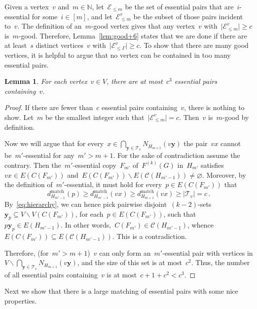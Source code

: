 \documentclass[oneside, 12pt]{amsart}
\numberwithin{equation}{section}
\numberwithin{figure}{section}
\let\emptyset=\varnothing
\let\setminus=\smallsetminus
\newcommand{\cC}{\mathcal{C}}
\newcommand{\cE}{\mathcal{E}}
\newcommand{\cT}{\mathcal{T}}
\theoremstyle{plain}
\newtheorem{lemma}[theorem]{Lemma}
\theoremstyle{note}
\theoremstyle{remark}
\begin{document}
	Given a vertex~$v$ and~$m\in\mathds{N}$, 
    let~$\cE_{\leq m}$ be the set of essential pairs that are~$i$-essential for some~$i\in[m]$, and let~$\cE_{\leq m}^v$ be the subset of those pairs incident to~$v$.
    The definition of an~$m$-good vertex gives that any vertex~$v$ with~$\vert\cE_{\leq m}^v\vert\geq c$ is~$m$-good.
    Therefore, Lemma~\ref{lem:good+6} states that we are done if there are at least~$s$ distinct vertices~$v$ with~$\vert\cE_{\leq\Gamma}^v\vert\geq c$.
    To show that there are many good vertices, it is helpful to argue that no vertex can be contained in too many essential pairs.
    
	\begin{lemma} \label{lem:essential+bounded}
		For each vertex~$v\in V$, there are at most~$c^3$ essential pairs containing~$v$.
	\end{lemma}
	\begin{proof}
		If there are fewer than~$c$ essential pairs containing~$v$, there is nothing to show.
		Let~$m$ be the smallest integer such that~$\vert\cE_{\leq m}^v\vert= c$.
		Then~$v$ is~$m$-good by definition.
		
		Now we will argue that for every~$x\in \bigcap_{\mathbf{y}\in\cT_v}N_{H_{m+1}}(v\mathbf{y})$ the pair~$vx$ cannot be~$m'$-essential for any~$m'>m+1$.
		For the sake of contradiction assume the contrary.
		Then the~$m'$-essential copy~$F_{m'}$ of~$F^{(k)}(G)$ in~$H_{m'}$ satisfies~$vx\in E(C(F_{m'}))$ and~$E(C(F_{m'}))\setminus E(\cC(H_{m'-1}))\neq\emptyset$.
		Moreover, by the definition of~$m'$-essential, it must hold for every~$p\in E(C(F_{m'}))$ that $$d^{\text{match}}_{H_{m'-1}}(p)\geq d^{\text{match}}_{H_{m'-1}}(vx)\geq d^{\text{match}}_{H_{m+1}}(vx)\geq\vert\cT_v\vert=c\,.$$
		By~\eqref{eq:hierarchy}, we can hence pick pairwise disjoint~$(k-2)$-sets~$\mathbf{y}_p\subseteq V\setminus V(C(F_{m'}))$, for each~$p\in E(C(F_{m'}))$, such that~$p\mathbf{y}_p\in E(H_{m'-1})$.
		In other words,~$C(F_{m'})\in\cC(H_{m'-1})$, whence~$E(C(F_{m'}))\subseteq E(\cC(H_{m'-1}))$.
		This is a contradiction.
		
		Therefore, (for~$m'>m+1$)~$v$ can only form an~$m'$-essential pair with vertices in $V\setminus\bigcap_{\mathbf{y} \in \cT_v} N_{H_{m+1}}(v\mathbf{y})$, and the size of this set is at most~$c^2$. 
		Thus, the number of all essential pairs containing~$v$ is at most~$c +1+ c^2 < c^3$.
	\end{proof} 

    Next we show that there is a large matching of essential pairs with some nice properties.
    
\end{document}
